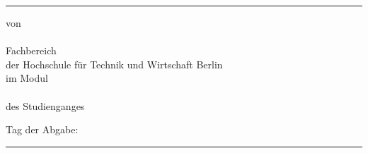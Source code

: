 {      \textcolor{HKS66}{\rule{\linewidth}{.4mm}}
      \begin{center}
        \begin{hsheadfont}
          \textcolor{\headcolor}{\LARGE \textbf{\thetitel}}
        \end{hsheadfont}
      \end{center}
      \begin{hsheadfont}
        \begin{center}
          \textbf{\Large{\thethesistyp}}
        \end{center}
      \end{hsheadfont}
      \begin{center}
        \begin{hsfont}
          von\\[2ex]
          {\textbf{\large\theautor}}\\[2ex]
          Fachbereich \thefachbereich\\
          der Hochschule für Technik und Wirtschaft Berlin\\[2ex]
          im Modul\\
          {\textbf{\theabschluss}}\\[2ex]
          des Studienganges\\
          \textbf{\thestudiengang}
        \end{hsfont}
      \end{center}
     
       \begin{center}
         Tag der Abgabe: \thedatum 
       \end{center}
         
      
      \thebetreuerFeld
      

      \textcolor{HKS66}{\rule{\linewidth}{0.4mm}}\\[1.5ex]
       \begin{hsheadfont}
         ~\hfill~
       \end{hsheadfont}
    }
